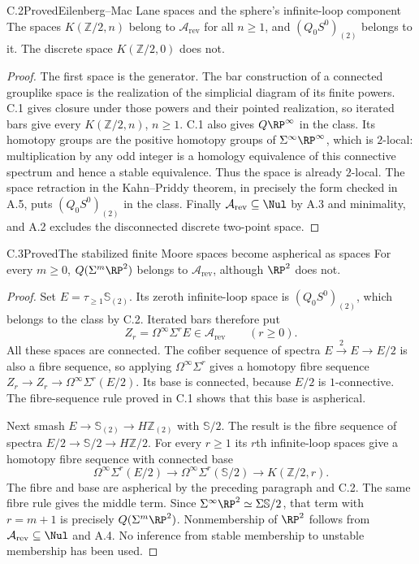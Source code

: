 \begin{claim}{C.2}{Proved}{Eilenberg--Mac Lane spaces and the sphere's infinite-loop component}
The spaces $K(\mathbb Z/2,n)$ belong to $\mathcal A_{\mathrm{rev}}$ for all $n\geq1$, and $(Q_0S^0)_{(2)}$ belongs to it. The discrete space $K(\mathbb Z/2,0)$ does not.
\end{claim}
\begin{proof}
The first space is the generator. The bar construction of a connected grouplike space is the realization of the simplicial diagram of its finite powers. C.1 gives closure under those powers and their pointed realization, so iterated bars give every $K(\mathbb Z/2,n)$, $n\geq1$. C.1 also gives $Q\RP^\infty$ in the class. Its homotopy groups are the positive homotopy groups of $\Sigma^\infty\RP^\infty$, which is $2$-local: multiplication by any odd integer is a homology equivalence of this connective spectrum and hence a stable equivalence. Thus the space is already $2$-local. The space retraction in the Kahn--Priddy theorem, in precisely the form checked in A.5, puts $(Q_0S^0)_{(2)}$ in the class. Finally $\mathcal A_{\mathrm{rev}}\subseteq\Nul$ by A.3 and minimality, and A.2 excludes the disconnected discrete two-point space.
\end{proof}

\begin{claim}{C.3}{Proved}{The stabilized finite Moore spaces become aspherical as spaces}
For every $m\geq0$, $Q(\Sigma^m\RP^2)$ belongs to $\mathcal A_{\mathrm{rev}}$, although $\RP^2$ does not.
\end{claim}
\begin{proof}
Set $E=\tau_{\geq1}\mathbb S_{(2)}$. Its zeroth infinite-loop space is $(Q_0S^0)_{(2)}$, which belongs to the class by C.2. Iterated bars therefore put
\[
 Z_r=\Omega^\infty\Sigma^rE\in\mathcal A_{\mathrm{rev}}
 \qquad(r\geq0).
\]
All these spaces are connected. The cofiber sequence of spectra $E\xrightarrow{2}E\to E/2$ is also a fibre sequence, so applying $\Omega^\infty\Sigma^r$ gives a homotopy fibre sequence $Z_r\to Z_r\to\Omega^\infty\Sigma^r(E/2)$. Its base is connected, because $E/2$ is $1$-connective. The fibre-sequence rule proved in C.1 shows that this base is aspherical.

Next smash $E\to\mathbb S_{(2)}\to H\mathbb Z_{(2)}$ with $\mathbb S/2$. The result is the fibre sequence of spectra $E/2\to\mathbb S/2\to H\mathbb Z/2$. For every $r\geq1$ its $r$th infinite-loop spaces give a homotopy fibre sequence with connected base
\[
 \Omega^\infty\Sigma^r(E/2)\longrightarrow
 \Omega^\infty\Sigma^r(\mathbb S/2)\longrightarrow
 K(\mathbb Z/2,r).
\]
The fibre and base are aspherical by the preceding paragraph and C.2. The same fibre rule gives the middle term. Since $\Sigma^\infty\RP^2\simeq\Sigma\mathbb S/2$, that term with $r=m+1$ is precisely $Q(\Sigma^m\RP^2)$. Nonmembership of $\RP^2$ follows from $\mathcal A_{\mathrm{rev}}\subseteq\Nul$ and A.4. No inference from stable membership to unstable membership has been used.
\end{proof}

